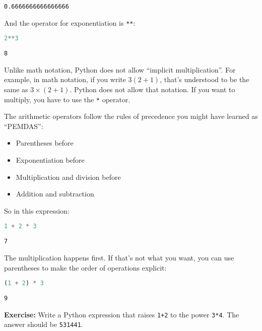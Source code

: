 \begin{lstlisting}[]
0.6666666666666666
\end{lstlisting}

And the operator for exponentiation is \passthrough{\lstinline!**!}:

\begin{lstlisting}[language=Python]
2**3
\end{lstlisting}

\begin{lstlisting}[]
8
\end{lstlisting}

Unlike math notation, Python does not allow ``implicit multiplication''.
For example, in math notation, if you write \(3 (2 + 1)\), that's
understood to be the same as \(3 \times (2+ 1)\). Python does not allow
that notation. If you want to multiply, you have to use the
\passthrough{\lstinline!*!} operator.

The arithmetic operators follow the rules of precedence you might have
learned as ``PEMDAS'':

\begin{itemize}
\item
  Parentheses before
\item
  Exponentiation before
\item
  Multiplication and division before
\item
  Addition and subtraction
\end{itemize}

So in this expression:

\begin{lstlisting}[language=Python]
1 + 2 * 3
\end{lstlisting}

\begin{lstlisting}[]
7
\end{lstlisting}

The multiplication happens first. If that's not what you want, you can
use parentheses to make the order of operations explicit:

\begin{lstlisting}[language=Python]
(1 + 2) * 3
\end{lstlisting}

\begin{lstlisting}[]
9
\end{lstlisting}

\textbf{Exercise:} Write a Python expression that raises
\passthrough{\lstinline!1+2!} to the power
\passthrough{\lstinline!3*4!}. The answer should be
\passthrough{\lstinline!531441!}.


